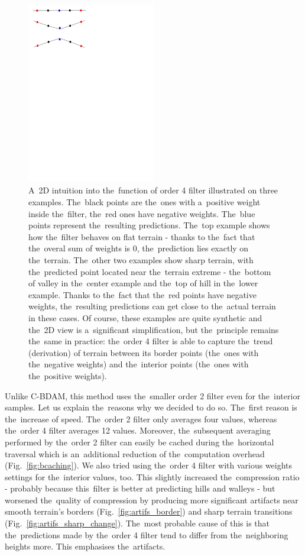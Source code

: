\begin{figure}
	\includegraphics[trim={0 21cm 10cm 0}, clip, width=0.5\textwidth]{figures/order4_flat.pdf}\centering
	\caption{A~2D intuition into the~function of order 4 filter illustrated on three examples. The~black points are the~ones with a~positive weight inside the~filter, the~red ones have negative weights. The~blue points represent the~resulting predictions. The~top example shows how the~filter behaves on flat terrain - thanks to the~fact that the~overal sum of weights is 0, the~prediction lies exactly on the~terrain. The~other two examples show sharp terrain, with the~predicted point located near the~terrain extreme - the~bottom of valley in the~center example and the~top of hill in the~lower example. Thanks to the~fact that the~red points have negative weights, the~resulting predictions can get close to the~actual terrain in these cases. Of course, these examples are quite synthetic and the~2D view is a~significant simplification, but the~principle remains the~same in practice: the~order 4 filter is able to capture the~trend (derivation) of terrain between its border points (the~ones with the~negative weights) and the~interior points (the~ones with the~positive weights).}
	\label{fig:order4_hills}
\end{figure}

Unlike C-BDAM, this method uses the~smaller order 2 filter even for the~interior samples. Let us explain the~reasons why we decided to do so. The~first reason is the~increase of speed. The~order 2 filter only averages four values, whereas the~order 4 filter averages 12 values. Moreover, the~subsequent averaging performed by the~order 2 filter can easily be cached during the~horizontal traversal which is an~additional reduction of the~computation overhead (Fig.~\ref{fig:bcaching}). We also tried using the~order 4 filter with various weights settings for the~interior values, too. This slightly increased the~compression ratio - probably because this~filter is better at predicting hills and walleys - but worsened the~quality of compression by producing more significant artifacts near smooth terrain's borders (Fig.~\ref{fig:artifs_border}) and sharp terrain transitions (Fig.~\ref{fig:artifs_sharp_change}). The~most probable cause of this is that the~predictions made by the~order 4 filter tend to differ from the~neighboring heights more. This emphasises the~artifacts.

